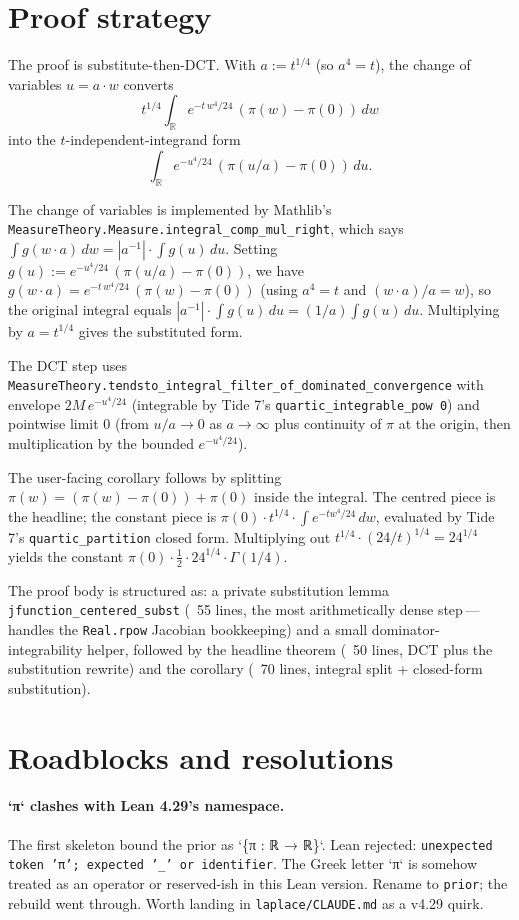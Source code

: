 \documentclass[11pt]{article}
\begin{document}
\section{Proof strategy}

The proof is substitute-then-DCT. With $a := t^{1/4}$ (so $a^4 = t$),
the change of variables $u = a \cdot w$ converts
\[
  t^{1/4} \int_\mathbb{R} e^{-t\,w^4/24}\,(\pi(w) - \pi(0))\,dw
\]
into the $t$-independent-integrand form
\[
  \int_\mathbb{R} e^{-u^4/24}\,(\pi(u/a) - \pi(0))\,du.
\]

The change of variables is implemented by Mathlib's
\texttt{MeasureTheory.Measure.integral\_comp\_mul\_right}, which says
$\int g(w \cdot a)\,dw = |a^{-1}| \cdot \int g(u)\,du$. Setting
$g(u) := e^{-u^4/24}\,(\pi(u/a) - \pi(0))$, we have
$g(w \cdot a) = e^{-t\,w^4/24}\,(\pi(w) - \pi(0))$ (using
$a^4 = t$ and $(w \cdot a)/a = w$), so the original integral equals
$|a^{-1}| \cdot \int g(u)\,du = (1/a) \int g(u)\,du$. Multiplying by
$a = t^{1/4}$ gives the substituted form.

The DCT step uses
\texttt{MeasureTheory.tendsto\_integral\_filter\_of\_dominated\_convergence}
with envelope $2M\,e^{-u^4/24}$ (integrable by Tide 7's
\texttt{quartic\_integrable\_pow\,0}) and pointwise limit $0$
(from $u/a \to 0$ as $a \to \infty$ plus continuity of $\pi$ at the
origin, then multiplication by the bounded $e^{-u^4/24}$).

The user-facing corollary follows by splitting
$\pi(w) = (\pi(w) - \pi(0)) + \pi(0)$ inside the integral. The
centred piece is the headline; the constant piece is
$\pi(0) \cdot t^{1/4} \cdot \int e^{-t w^4/24}\,dw$, evaluated by
Tide 7's \texttt{quartic\_partition} closed form. Multiplying out
$t^{1/4} \cdot (24/t)^{1/4} = 24^{1/4}$ yields the constant
$\pi(0) \cdot \tfrac12 \cdot 24^{1/4} \cdot \Gamma(1/4)$.

The proof body is structured as: a private substitution lemma
\texttt{jfunction\_centered\_subst} (~55 lines, the most
arithmetically dense step\,---\,handles the
\texttt{Real.rpow} Jacobian bookkeeping) and a small dominator-
integrability helper, followed by the headline theorem (~50 lines,
DCT plus the substitution rewrite) and the corollary (~70 lines,
integral split + closed-form substitution).

\section{Roadblocks and resolutions}

\paragraph{`π` clashes with Lean 4.29's namespace.} The first
skeleton bound the prior as `\{π : ℝ → ℝ\}`. Lean rejected: \texttt{unexpected token 'π'; expected '\_' or
identifier}. The Greek letter `π` is somehow treated as an operator
or reserved-ish in this Lean version. Rename to \texttt{prior}; the
rebuild went through. Worth landing in \texttt{laplace/CLAUDE.md} as
a v4.29 quirk.
\end{document}
